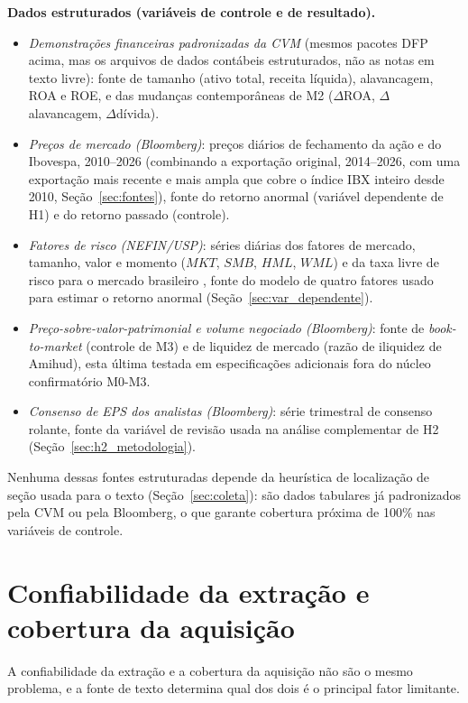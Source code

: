 \documentclass[a4paper,12pt]{report}
\begin{document}
\textbf{Dados estruturados (variáveis de controle e de resultado).}
\begin{itemize}
    \item \textit{Demonstrações financeiras padronizadas da CVM} (mesmos pacotes DFP acima, mas os arquivos de dados contábeis estruturados, não as notas em texto livre): fonte de tamanho (ativo total, receita líquida), alavancagem, ROA e ROE, e das mudanças contemporâneas de M2 ($\Delta$ROA, $\Delta$alavancagem, $\Delta$dívida).
    \item \textit{Preços de mercado (Bloomberg)}: preços diários de fechamento da ação e do Ibovespa, 2010--2026 (combinando a exportação original, 2014--2026, com uma exportação mais recente e mais ampla que cobre o índice IBX inteiro desde 2010, Seção~\ref{sec:fontes}), fonte do retorno anormal (variável dependente de H1) e do retorno passado (controle).
    \item \textit{Fatores de risco (NEFIN/USP)}: séries diárias dos fatores de mercado, tamanho, valor e momento ($\mathit{MKT}$, $\mathit{SMB}$, $\mathit{HML}$, $\mathit{WML}$) e da taxa livre de risco para o mercado brasileiro \cite{nefin2026}, fonte do modelo de quatro fatores usado para estimar o retorno anormal (Seção~\ref{sec:var_dependente}).
    \item \textit{Preço-sobre-valor-patrimonial e volume negociado (Bloomberg)}: fonte de \textit{book-to-market} (controle de M3) e de liquidez de mercado (razão de iliquidez de Amihud), esta última testada em especificações adicionais fora do núcleo confirmatório M0-M3.
    \item \textit{Consenso de EPS dos analistas (Bloomberg)}: série trimestral de consenso rolante, fonte da variável de revisão usada na análise complementar de H2 (Seção~\ref{sec:h2_metodologia}).
\end{itemize}

Nenhuma dessas fontes estruturadas depende da heurística de localização de seção usada para o texto (Seção~\ref{sec:coleta}): são dados tabulares já padronizados pela CVM ou pela Bloomberg, o que garante cobertura próxima de 100\% nas variáveis de controle.

\section{Confiabilidade da extração e cobertura da aquisição}
\label{sec:confiabilidade}

A confiabilidade da extração e a cobertura da aquisição não são o mesmo problema, e a fonte de texto determina qual dos dois é o principal fator limitante.
\end{document}
